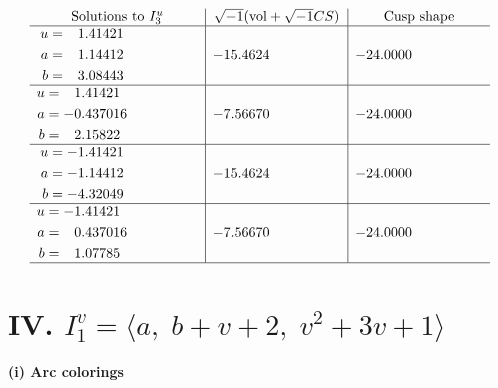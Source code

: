 \documentclass[1p]{elsarticle_modified}
\theoremstyle{definition}
\newcommand{\I}{\sqrt{-1}}
\begin{document}
$$\begin{array}{c|c|c}  
\text{Solutions to }I^u_{3}& \I (\text{vol} + \sqrt{-1}CS) & \text{Cusp shape}\\
 \hline 
\begin{aligned}
u &= \phantom{-}1.41421\phantom{ +0.000000I} \\
a &= \phantom{-}1.14412\phantom{ +0.000000I} \\
b &= \phantom{-}3.08443\phantom{ +0.000000I}\end{aligned}
 & -15.4624\phantom{ +0.000000I} & -24.0000\phantom{ +0.000000I} \\ \hline\begin{aligned}
u &= \phantom{-}1.41421\phantom{ +0.000000I} \\
a &= -0.437016\phantom{ +0.000000I} \\
b &= \phantom{-}2.15822\phantom{ +0.000000I}\end{aligned}
 & -7.56670\phantom{ +0.000000I} & -24.0000\phantom{ +0.000000I} \\ \hline\begin{aligned}
u &= -1.41421\phantom{ +0.000000I} \\
a &= -1.14412\phantom{ +0.000000I} \\
b &= -4.32049\phantom{ +0.000000I}\end{aligned}
 & -15.4624\phantom{ +0.000000I} & -24.0000\phantom{ +0.000000I} \\ \hline\begin{aligned}
u &= -1.41421\phantom{ +0.000000I} \\
a &= \phantom{-}0.437016\phantom{ +0.000000I} \\
b &= \phantom{-}1.07785\phantom{ +0.000000I}\end{aligned}
 & -7.56670\phantom{ +0.000000I} & -24.0000\phantom{ +0.000000I}\\
 \hline 
 \end{array}$$\newpage\newpage\renewcommand{\arraystretch}{1}
\centering \section*{IV. $I^v_{1}= \langle a,\;b+v+2,\;v^2+3 v+1 \rangle$}
\flushleft \textbf{(i) Arc colorings}\\
\end{document}
